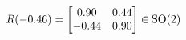 \documentclass[preview]{standalone}
\begin{document}
\begin{align*}
\special{dvisvgm:raw <g id='unique000'>}R(-0.46) = \begin{bmatrix} 0.90 & 0.44 \\ -0.44 & 0.90 \end{bmatrix} \in \text{SO}(2)\special{dvisvgm:raw </g>}
\end{align*}
\end{document}
